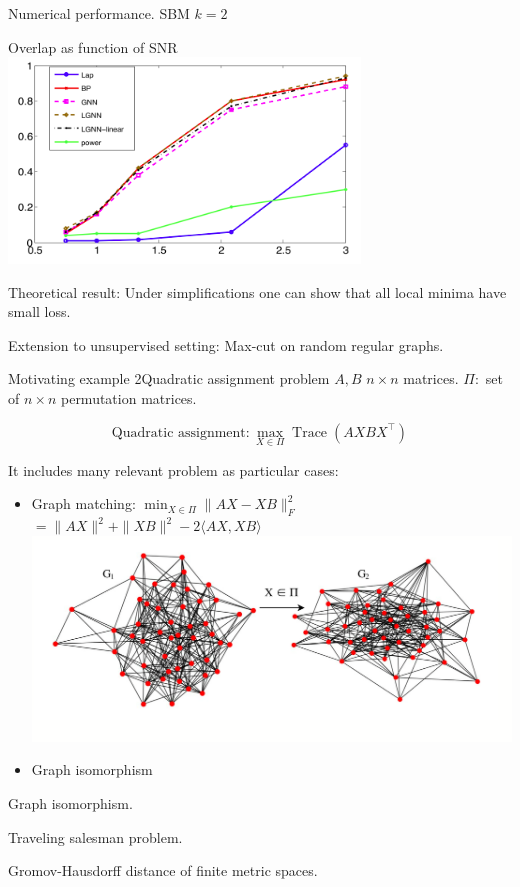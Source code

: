 \documentclass{beamer}
\begin{document}
\begin{frame}{Numerical performance. SBM $k=2$}

{\small 
\begin{center}
Overlap as function of SNR
\includegraphics[width=0.7\textwidth]{figs/bruna}
\end{center}

Theoretical result: Under simplifications one can show that all local minima have small loss. 

\pause
\vfill

Extension to unsupervised setting: Max-cut on random regular graphs.

}

\let\thefootnote\relax{}
\let\thefootnote\relax{}
\end{frame}

\begin{frame}{Motivating example 2}{Quadratic assignment problem}
$A,B$ $n\times n$ matrices. $\Pi:$ set of $n\times n$ permutation matrices.

$$\text{Quadratic assignment}: \max_{X\in \Pi} \operatorname{Trace}(AXBX^\top)$$
\smallskip

\pause
It includes many relevant problem as particular cases:
\begin{itemize}
\item Graph matching: {\scriptsize $\min_{X\in \Pi} \|AX-XB\|_F^2$\pause$=\|AX\|^2+\|XB\|^2 - 2 \langle AX, XB \rangle$} %
\includegraphics[height=.2\textwidth]{figs/matching}
\item<4-> Graph isomorphism
\end{itemize}
\color{white}

 Graph isomorphism.

Traveling salesman problem.

Gromov-Hausdorff distance of finite metric spaces.


\end{frame}
\end{document}
